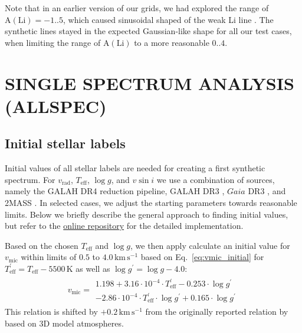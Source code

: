 \documentclass[
  journal=pasa,
  manuscript=research-paper, %
  year=2023,
  volume=37
]{cup-journal}
\newcommand{\Teff}{$T_\mathrm{eff}$\xspace}
\newcommand{\logg}{$\log g$\xspace}
\newcommand{\vmic}{$v_\mathrm{mic}$\xspace}
\newcommand{\vsini}{$v \sin i$\xspace}
\newcommand{\vrad}{$v_\mathrm{rad}$\xspace}
\newcommand{\Gaia}{\textit{Gaia}\xspace}
\newcommand{\kms}{\,\mathrm{km\,s^{-1}}}	%
\begin{document}
Note that in an earlier version of our grids, we had explored the range of $\mathrm{A(Li)} = -1..5$, which caused sinusoidal shaped of the weak Li line \citep[see also][]{Wang2020}. The synthetic lines stayed in the expected Gaussian-like shape for all our test cases, when limiting the range of $\mathrm{A(Li)}$ to a more reasonable $0..4$.

\newpage
\section{SINGLE SPECTRUM ANALYSIS (ALLSPEC)}
\label{sec:allspec_analysis}

\subsection{Initial stellar labels}
\label{sec:initial_stellar_labels}

Initial values of all stellar labels are needed for creating a first synthetic spectrum. For \vrad, \Teff, \logg, and \vsini we use a combination of sources, namely the GALAH DR4 reduction pipeline, GALAH DR3 \citep{Buder2021}, $\Gaia$ DR3 \citep{Brown2021}, and 2MASS \citep{Skrutskie2006}. In selected cases, we adjust the starting parameters towards reasonable limits. Below we briefly describe the general approach to finding initial values, but refer to the \href{https://github.com/svenbuder/GALAH_DR4/blob/main/spectrum_analysis/galah_dr4_initial_parameters.ipynb}{online repository} for the detailed implementation. 

Based on the chosen \Teff and \logg, we then apply calculate an initial value for \vmic within limits of $0.5$ to $4.0\kms$ based on Eq.~\ref{eq:vmic_initial} for $T_\text{eff}^\prime = T_\text{eff} - 5500\,\mathrm{K}$ as well as $\log g^\prime = \log g - 4.0$:
\begin{align} 
v_\text{mic} = \begin{array}{l}
1.198 + 3.16 \cdot 10^{-4} \cdot T_\text{eff}^\prime - 0.253 \cdot \log g^\prime \\ - 2.86\cdot 10^{-4} \cdot T_\text{eff}^\prime \cdot \log g^\prime + 0.165 \cdot \log g^\prime
\end{array} \label{eq:vmic_initial}
\end{align}
This relation is shifted by $+0.2\kms$ from the originally reported relation by \citet{DutraFerreira2016} based on 3D model atmospheres.
\end{document}
